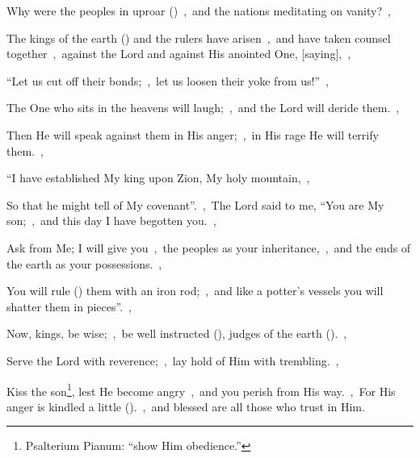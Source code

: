 \documentclass[12pt,twoside,a5paper]{article}
\begin{document}
\begin{normalparskip}
  Why were the peoples in uproar ()~\sep\ and the nations meditating on vanity?~\sep


  The kings of the earth () and the rulers have arisen~\sep\ and have taken counsel together~\sep\ against the Lord and against His anointed One, [saying],~\sep

  ``Let us cut off their bonds;~\sep\ let us loosen their yoke from us!''~\sep

  The One who sits in the heavens will laugh;~\sep\ and the Lord will deride them.~\sep

  Then He will speak against them in His anger;~\sep\ in His rage He will terrify them.~\sep

  ``I have established My king upon Zion, My holy mountain,~\sep

  So that he might tell of My covenant''.~\sep\ The Lord said to me, ``You are My son;~\sep\ and this day I have begotten you.~\sep

  Ask from Me; I will give you~\sep\ the peoples as your inheritance,~\sep\ and the ends of the earth as your possessions.~\sep

  You will rule () them with an iron rod;~\sep\ and like a potter's vessels you will shatter them in pieces''.~\sep

  Now, kings, be wise;~\sep\ be well instructed (), judges of the earth ().~\sep

  Serve the Lord with reverence;~\sep\ lay hold of Him with trembling.~\sep

  Kiss the son\footnote{Psalterium Pianum: ``show Him obedience.''}, lest He become angry~\sep\ and you perish from His way.~\sep\ For His anger is kindled a little ().~\sep\ and blessed are all those who trust in Him.
\end{normalparskip}

\end{document}
